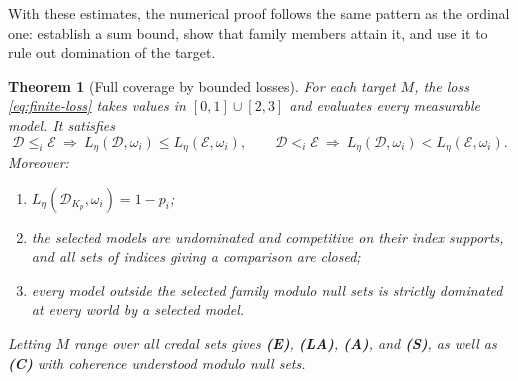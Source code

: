 \documentclass[11pt]{article}
\newtheorem{theorem}{Theorem}
\theoremstyle{remark}
\newcommand{\Dscr}{\mathcal D}
\newcommand{\Escr}{\mathcal E}
\begin{document}
With these estimates, the numerical proof follows the same pattern as the
ordinal one: establish a sum bound, show that family members attain it,
and use it to rule out domination of the target.

\begin{theorem}[Full coverage by bounded losses]\label{thm:numerical}
For each target $M$, the loss \eqref{eq:finite-loss} takes values in
$[0,1]\cup[2,3]$ and evaluates every measurable model. It satisfies
\[
 \Dscr\le_i\Escr\ \Longrightarrow\ L_\eta(\Dscr,\omega_i)\le L_\eta(\Escr,\omega_i),\qquad
 \Dscr<_i\Escr\ \Longrightarrow\ L_\eta(\Dscr,\omega_i)<L_\eta(\Escr,\omega_i).
\]
Moreover:
\begin{enumerate}[label=(\alph*)]
\item $L_\eta(\Dscr_{K_p},\omega_i)=1-p_i$;
\item the selected models are undominated and competitive on their index
supports, and all sets of indices giving a comparison are closed;
\item every model outside the selected family modulo null sets is strictly
dominated at every world by a selected model.
\end{enumerate}
Letting $M$ range over all credal sets gives \textbf{(E)}, \textbf{(LA)},
\textbf{(A)}, and \textbf{(S)}, as well as \textbf{(C)} with coherence
understood modulo null sets.
\end{theorem}
\end{document}
